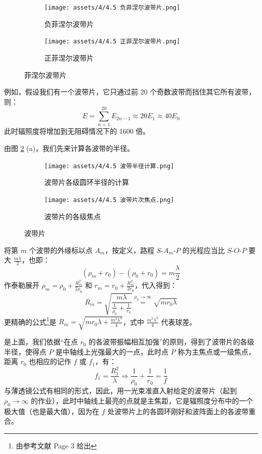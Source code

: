 \documentclass[UTF8]{report}
\theoremstyle{MyLineTheoremStyle} %
\theoremstyle{MyBlockTheoremStyle} %
\theoremstyle{MySubsubsectionStyle} %
\begin{document}
\begin{figure}[H]\centering
\begin{subfigure}[b]{0.5\columnwidth}\centering
    \texttt{[image: assets/4/4.5 负菲涅尔波带片.png]}
    \caption{负菲涅尔波带片}
\end{subfigure}\hfill
\begin{subfigure}[b]{0.5\columnwidth}\centering
    \texttt{[image: assets/4/4.5 正菲涅尔波带片.png]}
    \caption{正菲涅尔波带片}
\end{subfigure}
\caption{菲涅尔波带片}
\label{菲涅尔波带片}
\end{figure}

例如，假设我们有一个波带片，它只通过前 20 个奇数波带而挡住其它所有波带，则：
\begin{equation}
E = \sum_{n=1}^{20}E_{2n-1} \approx 20 E_1 \approx 40 E_0
\end{equation}
此时辐照度将增加到无阻碍情况下的 1600 倍。

由图 \ref{波带片} (a)，我们先来计算各波带的半径。
\begin{figure}[H]\centering
\begin{subfigure}[b]{0.53\columnwidth}\centering
    \texttt{[image: assets/4/4.5 波带半径计算.png]}
    \caption{波带片各级圆环半径的计算}
\end{subfigure}\hfill
\begin{subfigure}[b]{0.46\columnwidth}\centering
    \texttt{[image: assets/4/4.5 波带片次焦点.png]}
    \caption{波带片的各级焦点}
\end{subfigure}
\caption{波带片}
\label{波带片}
\end{figure}
将第 $m$ 个波带的外缘标以点 $A_m$，按定义，路程 $S$-$A_m$-$P$ 的光程应当比 $S$-$O$-$P$ 要大 $\frac{m\lambda}{2}$，也即：
\begin{equation}
(\rho_m + r_0) - (\rho_0 + r_0) = m \frac{\lambda}{2}
\end{equation}
作泰勒展开 $\rho_m = \rho_0 + \frac{R_m^2}{2\rho_0}$ 和 $r_m = r_0 + \frac{R_m^2}{2r_0}$，代入得到：
\begin{equation}
R_m = \sqrt{ \frac{m\lambda}{\frac{1}{\rho_0} + \frac{1}{r_0}} } \overset{\rho_0 \to \infty}{=}\sqrt{m r_0 \lambda}
\end{equation}
更精确的公式\footnote{由参考文献 \cite{波带片的设计及其衍射特性研究} Page 3 给出}是 $R_m = \sqrt{mr_0\lambda + \frac{m^2\lambda^2}{4}}$，式中 $\frac{m^2\lambda^2}{4}$ 代表球差。

是上面，我们依据“在点 $r_0$ 的各波带振幅相互加强”的原则，得到了波带片的各级半径，使得点 $P$ 是中轴线上光强最大的一点，此时点 $P$ 称为主焦点或一级焦点，距离 $r_0$ 也相应的记作 $f$ 或 $f_1$，有：
\begin{equation}
f_1 = \frac{R_1^2}{\lambda} \Longrightarrow  \frac{1}{\rho_0} + \frac{1}{r_0} = \frac{1}{f}
\end{equation}
与薄透镜公式有相同的形式，因此，用一光束准直入射给定的波带片（起到 $\rho_0 \to \infty$ 的作业），此时中轴线上最亮的点就是主焦距，它是辐照度分布中的一个极大值（也是最大值），因为在 $f$ 处波带片上的各圆环刚好和波阵面上的各波带重合。
\end{document}
